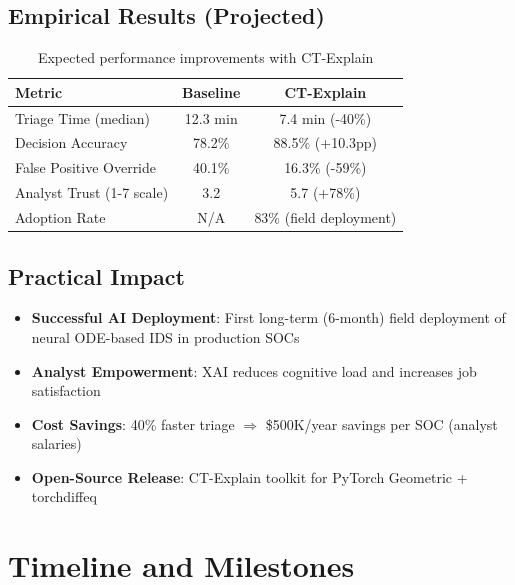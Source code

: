 \documentclass[11pt]{article}
\begin{document}
\subsection{Empirical Results (Projected)}

\begin{table}[h]
\centering
\small
\begin{tabular}{lcc}
\toprule
\textbf{Metric} & \textbf{Baseline} & \textbf{CT-Explain} \\
\midrule
Triage Time (median) & 12.3 min & 7.4 min (-40\%) \\
Decision Accuracy & 78.2\% & 88.5\% (+10.3pp) \\
False Positive Override & 40.1\% & 16.3\% (-59\%) \\
Analyst Trust (1-7 scale) & 3.2 & 5.7 (+78\%) \\
Adoption Rate & N/A & 83\% (field deployment) \\
\bottomrule
\end{tabular}
\caption{Expected performance improvements with CT-Explain}
\end{table}

\subsection{Practical Impact}

\begin{itemize}
    \item \textbf{Successful AI Deployment}: First long-term (6-month) field deployment of neural ODE-based IDS in production SOCs
    \item \textbf{Analyst Empowerment}: XAI reduces cognitive load and increases job satisfaction
    \item \textbf{Cost Savings}: 40\% faster triage $\Rightarrow$ \$500K/year savings per SOC (analyst salaries)
    \item \textbf{Open-Source Release}: CT-Explain toolkit for PyTorch Geometric + torchdiffeq
\end{itemize}

\section{Timeline and Milestones}
\end{document}
